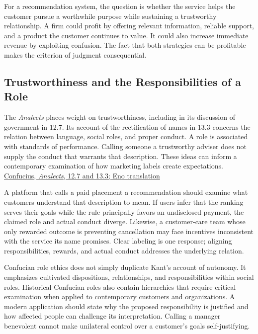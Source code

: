For a recommendation system, the question is whether the service helps
the customer pursue a worthwhile purpose while sustaining a trustworthy
relationship. A firm could profit by offering relevant information,
reliable support, and a product the customer continues to value. It
could also increase immediate revenue by exploiting confusion. The fact
that both strategies can be profitable makes the criterion of judgment
consequential.

\hypertarget{M09-trustworthiness-and-the-responsibilities-of-a-role}{%
\subsection{Trustworthiness and the Responsibilities of a
Role}\label{M09-trustworthiness-and-the-responsibilities-of-a-role}}

\noindent \noindent The \emph{Analects} places weight on trustworthiness,
including in its discussion of government in 12.7. Its account of the
rectification of names in 13.3 concerns the relation between language,
social roles, and proper conduct. A role is associated with standards of
performance. Calling someone a trustworthy adviser does not supply the
conduct that warrants that description. These ideas can inform a
contemporary examination of how marketing labels create expectations.
\href{https://scholarworks.iu.edu/bitstreams/d1f62d31-9082-41d0-999f-4c3efa0c8857/download}{Confucius,
\emph{Analects}, 12.7 and 13.3; Eno translation}

A platform that calls a paid placement a recommendation should examine
what customers understand that description to mean. If users infer that
the ranking serves their goals while the rule principally favors an
undisclosed payment, the claimed role and actual conduct diverge.
Likewise, a customer-care team whose only rewarded outcome is preventing
cancellation may face incentives inconsistent with the service its name
promises. Clear labeling is one response; aligning responsibilities,
rewards, and actual conduct addresses the underlying relation.

Confucian role ethics does not simply duplicate Kant's account of
autonomy. It emphasizes cultivated dispositions, relationships, and
responsibilities within social roles. Historical Confucian roles also
contain hierarchies that require critical examination when applied to
contemporary customers and organizations. A modern application should
state why the proposed responsibility is justified and how affected
people can challenge its interpretation. Calling a manager benevolent
cannot make unilateral control over a customer's goals self-justifying.

